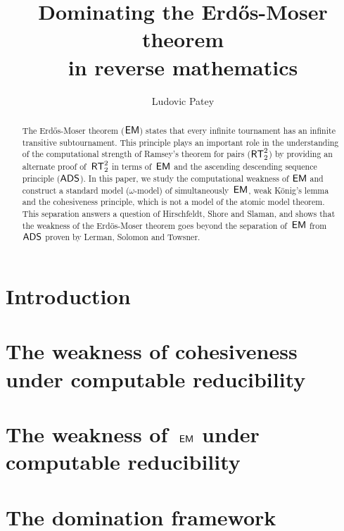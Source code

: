 \documentclass[a4paper,11pt,reqno]{customart}
\newcommand{\s}[1]{\ensuremath{\sf{#1}}}
\DeclareMathOperator{\rt}{\s{RT}}
\DeclareMathOperator{\ads}{\s{ADS}}
\DeclareMathOperator{\emo}{\s{EM}}
\theoremstyle{custom}
\begin{document}
\title[Dominating the Erd\H{o}s-Moser theorem]{Dominating the Erd\H{o}s-Moser theorem\\ in reverse mathematics}
\author{
  Ludovic Patey
}

\begin{abstract}
The Erd\H{o}s-Moser theorem ($\emo$) states that every infinite tournament has an infinite
transitive subtournament. This principle plays an important role in the understanding of
the computational strength of Ramsey's theorem for pairs ($\rt^2_2$) by providing an alternate
proof of~$\rt^2_2$ in terms of~$\emo$ and the ascending descending sequence principle ($\ads$).
In this paper, we study the computational weakness of $\emo$ and construct
a standard model ($\omega$-model) of simultaneously~$\emo$, weak K\"onig's lemma and the cohesiveness
principle, which is not a model of the atomic model theorem. 
This separation answers a question of Hirschfeldt, Shore and Slaman,
and shows that the weakness of the Erd\"os-Moser theorem goes beyond the separation
of~$\emo$ from~$\ads$ proven by Lerman, Solomon and Towsner.
\end{abstract}

\maketitle

\section{Introduction}


\section{The weakness of cohesiveness under computable reducibility}


\section{The weakness of~$\emo$ under computable reducibility}\label{sect:emo-computable-reducibility}


\section{The domination framework}

\end{document}
